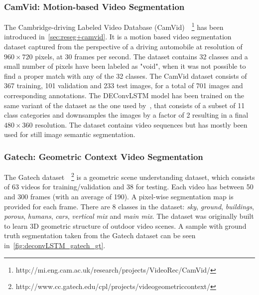 \subsubsection{CamVid: Motion-based Video Segmentation}
\label{sec:deconvLSTM_camvid}
The Cambridge-driving Labeled Video Database (CamVid)~\cite{
Brostow2010semantic}~\footnote{%
http://mi.eng.cam.ac.uk/research/projects/VideoRec/CamVid/}
has been introduced in~\autoref{sec:reseg+camvid}. It is a motion based video
segmentation dataset captured from the perspective of a driving automobile at
resolution of $960 \times 720$ pixels, at 30 frames per second. The dataset
contains 32 classes and a small number of pixels have been labeled as "void",
when it was not possible to find a proper match with any of the 32 classes. The
CamVid dataset consists of 367 training, 101 validation and 233 test images,
for a total of 701 images and corresponding annotations. The DEConvLSTM model
has been trained on the same variant of the dataset as the one used
by~\cite{badrinarayanan2015segnet}, that consists of a subset of 11 class
categories and downsamples the images by a factor of 2 resulting in a final
$480 \times 360$ resolution. The dataset contains video sequences but has
mostly been used for still image semantic segmentation.


\subsubsection{Gatech: Geometric Context Video Segmentation}
\label{sec:deconvLSTM_gatech}
The Gatech dataset~\cite{VideoGeometricContext2013}~\footnote{%
http://www.cc.gatech.edu/cpl/projects/videogeometriccontext/}
is a geometric scene understanding dataset, which consists of 63 videos for
training/validation and 38 for testing. Each video has between 50 and 300
frames (with an average of 190). A pixel-wise segmentation map is provided for
each frame. There are 8 classes in the dataset: \textit{sky}, \textit{ground},
\textit{buildings}, \textit{porous}, \textit{humans}, \textit{cars},
\textit{vertical mix} and \textit{main mix}. The dataset was originally built
to learn 3D geometric structure of outdoor video scenes. A sample with ground
truth segmentation taken from the Gatech dataset can be seen
in~\autoref{fig:deconvLSTM_gatech_gt}.

